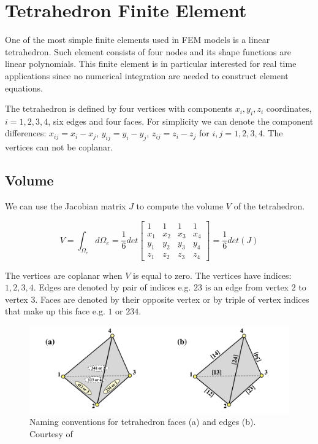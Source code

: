 \documentclass[en]{minipw} %
\begin{document}
\chapter{Tetrahedron Finite Element}
\label{chap:solid_mechanics2}

One of the most simple finite elements used in FEM models is a linear tetrahedron. Such element consists of four nodes and its shape functions are linear polynomials. This finite element is in particular interested for real time applications since no numerical integration are needed to construct element equations.

The tetrahedron is defined by four vertices with components $x_i, y_i, z_i$ coordinates, $i=1,2,3,4$, six edges and four faces. For simplicity we can denote the component differences: $x_{ij} = x_i - x_j$, $y_{ij} = y_i - y_j$, $z_{ij} = z_i - z_j$ for $i,j = 1,2,3,4$. The vertices can not be coplanar.

\section{Volume}

We can use the Jacobian matrix $J$ to compute the volume $V$ of the tetrahedron.

\begin{equation}
V = \int_{\Omega_{e}} d \Omega_{e} = \dfrac{1}{6} det
\begin{bmatrix}
1 & 1 & 1 & 1 \\
x_1 & x_2 & x_3 & x_4 \\
y_1 & y_2 & y_3 & y_4 \\
z_1 & z_2 & z_3 & z_4
\end{bmatrix}
= \dfrac{1}{6} det(J)
\end{equation}

The vertices are coplanar when $V$ is equal to zero. The vertices have indices: $1,2,3,4$. Edges are denoted by pair of indices e.g. $23$ is an edge from vertex $2$ to vertex $3$. Faces are denoted by their opposite vertex or by triple of vertex indices that make up this face e.g. $1$ or $234$.

\begin{figure}[h!]
\centering
\includegraphics[scale=0.5]{pictures/tetrahedron.png}
\caption[Tetrahedron Conventions]{Naming conventions for tetrahedron faces (a) and edges (b). Courtesy of~\cite{colorado_fem_lectures}}
\end{figure}
\end{document}
